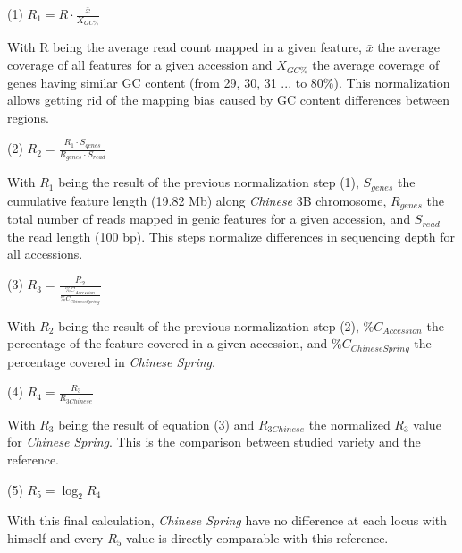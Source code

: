\documentclass[a4paper, 12pt]{article}
\begin{document}
\begin{onehalfspace}
\vspace{0.5cm}
(1) \hspace{2cm} $R_{1} = R \cdot \frac{\bar{x}}{X_{GC\%}}$
\vspace{0.5cm}

With R being the average read count mapped in a given feature, $\bar{x}$ the average coverage of all features for a given accession and $X_{GC\%}$ the average coverage of genes having similar GC content (from 29, 30, 31 ... to 80\%). This normalization allows getting rid  of the mapping bias caused by GC content differences between regions. 

\vspace{0.5cm}
(2) \hspace{2cm} $R_{2} = \frac{R_{1} \cdot S_{genes}}{R_{genes} \cdot S_{read}}$
\vspace{0.5cm}

With $R_{1}$ being the result of the previous normalization step (1), $S_{genes}$ the cumulative feature length (19.82 Mb) along \textit{Chinese} 3B chromosome, $R_{genes}$ the total number of reads mapped in genic features for a given accession, and $S_{read}$ the read length (100 bp). This steps normalize differences in sequencing depth for all accessions.

\vspace{0.5cm}
(3) \hspace{2cm} $R_{3} = \frac{R_{2}}{\frac{\%C_{Accession}}{\%C_{ChineseSpring}}}$
\vspace{0.5cm}

With $R_{2}$ being the result of the previous normalization step (2), $\%C_{Accession}$ the percentage of the feature covered in a given accession, and $\%C_{ChineseSpring}$ the percentage covered in \textit{Chinese Spring}.

\vspace{0.5cm}
(4) \hspace{2cm} $R_{4} = \frac{R_{3}}{R_{3 Chinese}}$
\vspace{0.5cm}

With $R_{3}$ being the result of equation (3) and $R_{3 Chinese}$ the normalized $R_{3}$ value for \textit{Chinese Spring}. This is the comparison between studied variety and the reference.

\vspace{0.5cm}
(5) \hspace{2cm} $R_{5} = \log_2{R_{4}}$
\vspace{0.5cm}

With this final calculation, \textit{Chinese Spring} have no difference at each locus with himself and every $R_{5}$ value is directly comparable with this reference.


\end{onehalfspace}
\end{document}
